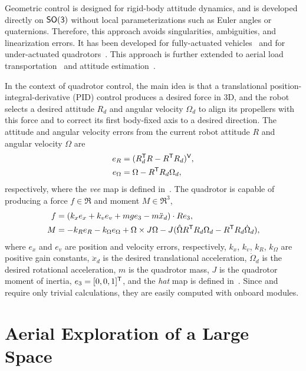 Geometric control is designed for rigid-body attitude dynamics, and is developed directly on $\mathsf{SO(3)}$ without local parameterizations such as Euler angles or quaternions. Therefore, this approach avoids singularities, ambiguities, and linearization errors. It has been developed for fully-actuated vehicles~\cite{KauCalLeeLee14} and for under-actuated quadrotors~\cite{LeeLeoMcc10,LeeLeo_4457,LeeLeo,GooDaeLee13}. This approach is further extended to aerial load transportation~\cite{GooLee14,GooLee16} and attitude estimation~\cite{WuKauLee15}.

In the context of quadrotor control, the main idea is that a translational position-integral-derivative (PID) control produces a desired force in 3D, and the robot selects a desired attitude $R_d$ and angular velocity $\Omega_d$ to align its propellers with this force and to correct its first body-fixed axis to a desired direction. The attitude and angular velocity errors from the current robot attitude $R$ and angular velocity $\Omega$ are 
\begin{align}
e_R&=(R_d^{\mathsf{T}} R-R^{\mathsf{T}} R_d)^{\mathsf{V}},
\\
e_\Omega&=\Omega-R^{\mathsf{T}} R_d\Omega_d,
\end{align}
respectively, where the \emph{vee} map is defined in~\cite{LeeLeo}. The quadrotor is capable of producing a force $f\in\Re$ and moment $M\in\Re^3$,
\begin{align}
\label{eqn:geometricf}
f&=(k_xe_x+k_ve_v+mge_3-m\ddot{x}_d)\cdot Re_3,
\\
\label{eqn:geometricM}
M&=-k_Re_R-k_\Omega e_\Omega+\Omega\times J\Omega-J(\hat{\Omega}R^{\mathsf{T}} R_d\Omega_d-R^{\mathsf{T}} R_d\dot\Omega_d),
\end{align}
where $e_x$ and $e_v$ are position and velocity errors, respectively, $k_x$, $k_v$, $k_R$, $k_\Omega$ are positive gain constants, $\ddot{x}_d$ is the desired translational acceleration, $\dot{\Omega}_d$ is the desired rotational acceleration, $m$ is the quadrotor mass, $J$ is the quadrotor moment of inertia, $e_3=[0, 0, 1]^{\mathsf{T}}$, and the \emph{hat} map is defined in~\cite{LeeLeo}. Since  and  require only trivial calculations, they are easily computed with onboard modules.





\section{Aerial Exploration of a Large Space}
\label{sec:QuadrotorNRL}


